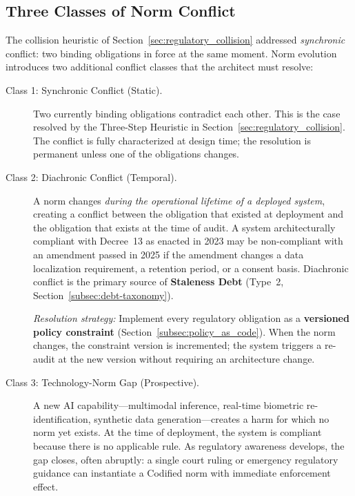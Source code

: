 \subsection{Three Classes of Norm Conflict}
\label{subsec:norm_conflict_classes}

The collision heuristic of Section~\ref{sec:regulatory_collision} addressed \emph{synchronic} conflict: two binding obligations in force at the same moment. Norm evolution introduces two additional conflict classes that the architect must resolve:

\begin{description}
  \item[Class 1: Synchronic Conflict (Static).]
    Two currently binding obligations contradict each other. This is the case resolved by the Three-Step Heuristic in Section~\ref{sec:regulatory_collision}. The conflict is fully characterized at design time; the resolution is permanent unless one of the obligations changes.

  \item[Class 2: Diachronic Conflict (Temporal).]
    A norm changes \emph{during the operational lifetime of a deployed system}, creating a conflict between the obligation that existed at deployment and the obligation that exists at the time of audit. A system architecturally compliant with Decree~13 as enacted in 2023 may be non-compliant with an amendment passed in 2025 if the amendment changes a data localization requirement, a retention period, or a consent basis. Diachronic conflict is the primary source of \textbf{Staleness Debt} (Type~2, Section~\ref{subsec:debt-taxonomy}).

    \textit{Resolution strategy:} Implement every regulatory obligation as a \textbf{versioned policy constraint} (Section~\ref{subsec:policy_as_code}). When the norm changes, the constraint version is incremented; the system triggers a re-audit at the new version without requiring an architecture change.

  \item[Class 3: Technology-Norm Gap (Prospective).]
    A new AI capability---multimodal inference, real-time biometric re-identification, synthetic data generation---creates a harm for which no norm yet exists. At the time of deployment, the system is compliant because there is no applicable rule. As regulatory awareness develops, the gap closes, often abruptly: a single court ruling or emergency regulatory guidance can instantiate a Codified norm with immediate enforcement effect.


\end{description}
